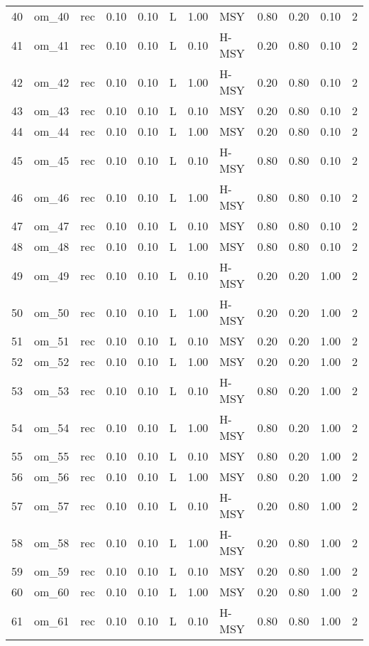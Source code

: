 \begin{table}[ht]
{\begin{tabular}{rllrrlrlrrrr}
  40 & om\_40 & rec & 0.10 & 0.10 & L & 1.00 & MSY & 0.80 & 0.20 & 0.10 &   2 \\ 
  41 & om\_41 & rec & 0.10 & 0.10 & L & 0.10 & H-MSY & 0.20 & 0.80 & 0.10 &   2 \\ 
  42 & om\_42 & rec & 0.10 & 0.10 & L & 1.00 & H-MSY & 0.20 & 0.80 & 0.10 &   2 \\ 
  43 & om\_43 & rec & 0.10 & 0.10 & L & 0.10 & MSY & 0.20 & 0.80 & 0.10 &   2 \\ 
  44 & om\_44 & rec & 0.10 & 0.10 & L & 1.00 & MSY & 0.20 & 0.80 & 0.10 &   2 \\ 
  45 & om\_45 & rec & 0.10 & 0.10 & L & 0.10 & H-MSY & 0.80 & 0.80 & 0.10 &   2 \\ 
  46 & om\_46 & rec & 0.10 & 0.10 & L & 1.00 & H-MSY & 0.80 & 0.80 & 0.10 &   2 \\ 
  47 & om\_47 & rec & 0.10 & 0.10 & L & 0.10 & MSY & 0.80 & 0.80 & 0.10 &   2 \\ 
  48 & om\_48 & rec & 0.10 & 0.10 & L & 1.00 & MSY & 0.80 & 0.80 & 0.10 &   2 \\ 
  49 & om\_49 & rec & 0.10 & 0.10 & L & 0.10 & H-MSY & 0.20 & 0.20 & 1.00 &   2 \\ 
  50 & om\_50 & rec & 0.10 & 0.10 & L & 1.00 & H-MSY & 0.20 & 0.20 & 1.00 &   2 \\ 
  51 & om\_51 & rec & 0.10 & 0.10 & L & 0.10 & MSY & 0.20 & 0.20 & 1.00 &   2 \\ 
  52 & om\_52 & rec & 0.10 & 0.10 & L & 1.00 & MSY & 0.20 & 0.20 & 1.00 &   2 \\ 
  53 & om\_53 & rec & 0.10 & 0.10 & L & 0.10 & H-MSY & 0.80 & 0.20 & 1.00 &   2 \\ 
  54 & om\_54 & rec & 0.10 & 0.10 & L & 1.00 & H-MSY & 0.80 & 0.20 & 1.00 &   2 \\ 
  55 & om\_55 & rec & 0.10 & 0.10 & L & 0.10 & MSY & 0.80 & 0.20 & 1.00 &   2 \\ 
  56 & om\_56 & rec & 0.10 & 0.10 & L & 1.00 & MSY & 0.80 & 0.20 & 1.00 &   2 \\ 
  57 & om\_57 & rec & 0.10 & 0.10 & L & 0.10 & H-MSY & 0.20 & 0.80 & 1.00 &   2 \\ 
  58 & om\_58 & rec & 0.10 & 0.10 & L & 1.00 & H-MSY & 0.20 & 0.80 & 1.00 &   2 \\ 
  59 & om\_59 & rec & 0.10 & 0.10 & L & 0.10 & MSY & 0.20 & 0.80 & 1.00 &   2 \\ 
  60 & om\_60 & rec & 0.10 & 0.10 & L & 1.00 & MSY & 0.20 & 0.80 & 1.00 &   2 \\ 
  61 & om\_61 & rec & 0.10 & 0.10 & L & 0.10 & H-MSY & 0.80 & 0.80 & 1.00 &   2 \\ 

\end{tabular}}
\end{table}
